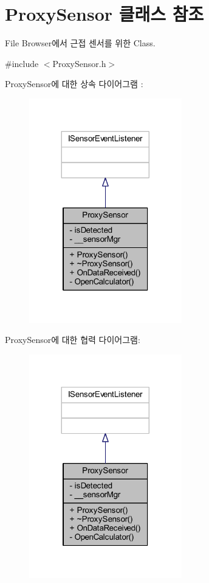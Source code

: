 \hypertarget{class_proxy_sensor}{\section{Proxy\+Sensor 클래스 참조}
\label{class_proxy_sensor}
}


File Browser에서 근접 센서를 위한 Class.  




{\ttfamily \#include $<$Proxy\+Sensor.\+h$>$}



Proxy\+Sensor에 대한 상속 다이어그램 \+: 
\nopagebreak
\begin{figure}[H]
\begin{center}
\leavevmode
\includegraphics[width=188pt]{class_proxy_sensor__inherit__graph}
\end{center}
\end{figure}


Proxy\+Sensor에 대한 협력 다이어그램\+:
\nopagebreak
\begin{figure}[H]
\begin{center}
\leavevmode
\includegraphics[width=188pt]{class_proxy_sensor__coll__graph}
\end{center}
\end{figure}
